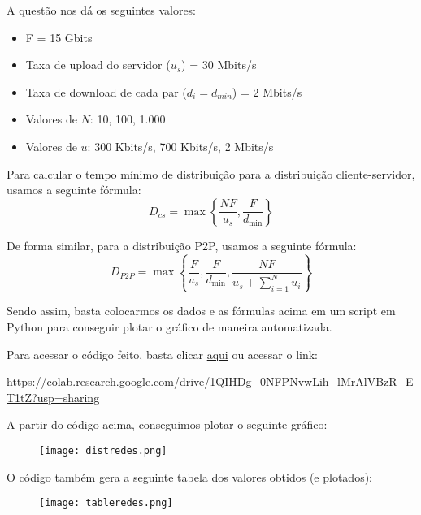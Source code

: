 \documentclass{homework}
\begin{document}
\begin{exercise}[P22)]

A questão nos dá os seguintes valores:

\begin{itemize}
  \item F = 15 Gbits
  \item Taxa de upload do servidor (\(u_s\)) = 30 Mbits/s
  \item Taxa de download de cada par (\(d_i = d_{min}\)) = 2 Mbits/s
  \item Valores de \(N\): 10, 100, 1.000
  \item Valores de \(u\): 300 Kbits/s, 700 Kbits/s, 2 Mbits/s
\end{itemize}

Para calcular o tempo mínimo de distribuição para a distribuição cliente-servidor, usamos a seguinte fórmula:
\begin{equation*}
    D_{cs} = \max \left\{ \frac{NF}{u_s}, \frac{F}{d_{\text{min}}} \right\} 
\end{equation*}

De forma similar, para a distribuição P2P, usamos a seguinte fórmula:
\begin{equation*}
    D_{P2P} = \max\left\{\frac{F}{u_s}, \frac{F}{d_{\text{min}}}, \frac{NF}{u_s + \sum_{i=1}^{N} u_i}\right\}
\end{equation*}

Sendo assim, basta colocarmos os dados e as fórmulas acima em um script em Python para conseguir plotar o gráfico de maneira automatizada. 

Para acessar o código feito, basta clicar \href{https://colab.research.google.com/drive/1QIHDg_0NFPNvwLih_lMrAlVBzR_ET1tZ?usp=sharing}{aqui} ou acessar o link:
\begin{center}
    \small{\url{https://colab.research.google.com/drive/1QIHDg_0NFPNvwLih_lMrAlVBzR_ET1tZ?usp=sharing}}
\end{center}

A partir do código acima, conseguimos plotar o seguinte gráfico:

\begin{figure}[htb!]
  \centering
  \texttt{[image: distredes.png]}
  \label{fig:distredes}
\end{figure}

O código também gera a seguinte tabela dos valores obtidos (e plotados):

\begin{figure}[htb!]
  \centering
  \texttt{[image: tableredes.png]}
  \label{fig:tableredes}
\end{figure}
\end{exercise}
\end{document}
